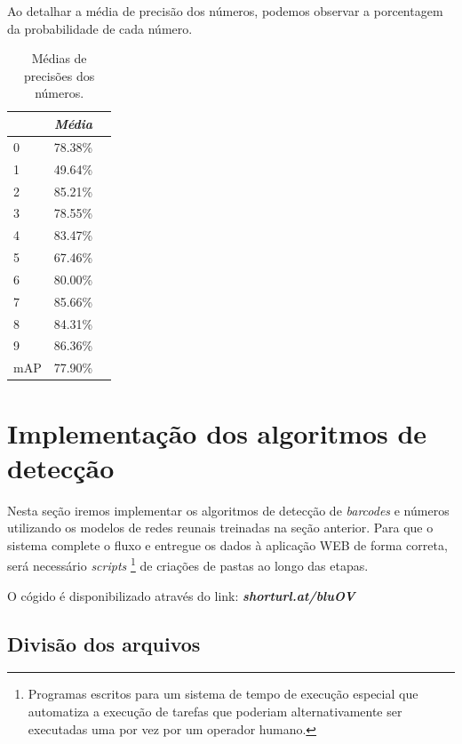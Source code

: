 Ao detalhar a média de precisão dos números, podemos observar a porcentagem da probabilidade de cada número.

\begin{table}[H]
	\centering
	\begin{tabular}{|l|l|l|}
		\hline
		\rowcolor[HTML]{ECF4FF} 
		\multicolumn{1}{|c|}{\cellcolor[HTML]{ECF4FF}\textit{\textit{Number}}} &
		\multicolumn{1}{|c|}{\cellcolor[HTML]{ECF4FF}\textit{Média}}\\ \hline 
		0&  78.38\% \\ \hline
		1&  49.64\% \\ \hline
		2&  85.21\% \\ \hline
		3&  78.55\%\\ \hline
		4&  83.47\% \\ \hline
		5&  67.46\% \\ \hline
		6&  80.00\% \\ \hline
		7&  85.66\% \\ \hline
		8&  84.31\% \\ \hline
		9&  86.36\% \\ \hline
		mAP&  77.90\% \\ \hline 
		
	\end{tabular}
	\caption{Médias de precisões dos números.}
	\label{tab:avgNumbersResult}
\end{table}


\section{Implementação dos algoritmos de detecção}

Nesta seção iremos implementar os algoritmos de detecção de \textit{barcodes} e números utilizando os modelos de redes reunais treinadas na seção anterior. Para que o sistema complete o fluxo e entregue os dados à aplicação WEB de forma correta, será necessário \textit{scripts} \footnote{Programas escritos para um sistema de tempo de execução especial que automatiza a execução de tarefas que poderiam alternativamente ser executadas uma por vez por um operador humano.} de criações de pastas ao longo das etapas.

O cógido é disponibilizado através do link: \textbf{\textit{shorturl.at/bluOV}}

\subsection*{Divisão dos arquivos}

